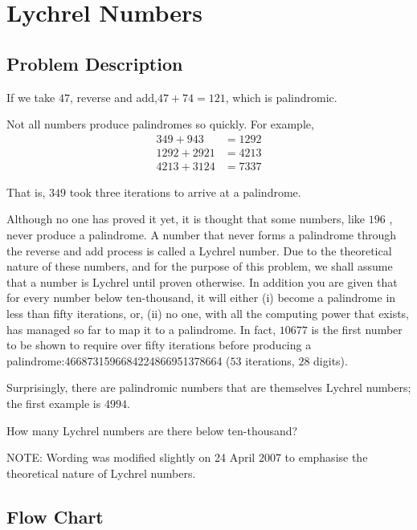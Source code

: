 \chapter{Lychrel Numbers}

\section{Problem Description}
If we take $47$, reverse and add,$47 + 74 = 121$, which is palindromic.

Not all numbers produce palindromes so quickly. For example,
\begin{align*}
	349 + 943   & = 1292 \\
	1292 + 2921 & = 4213 \\
	4213 + 3124 & = 7337
\end{align*}

That is, $349$ took three iterations to arrive at a palindrome.

Although no one has proved it yet, it is thought that some numbers, like $196$ 
, never produce a palindrome. A number that never forms a palindrome through the reverse and add process is called a
Lychrel number. Due to the theoretical nature of these numbers, and for the purpose of this problem, we shall assume
that a number is Lychrel until proven otherwise. In addition you are given that for every number below ten-thousand, it
will either (i) become a palindrome in less than fifty iterations, or, (ii) no one, with all the computing power that
exists, has managed so far to map it to a palindrome. In fact, $10677$
is the first number to be shown to require over fifty iterations before producing a palindrome:4668731596684224866951378664
($53$ iterations, $28$ digits).

Surprisingly, there are palindromic numbers that are themselves Lychrel numbers; the first example is $4994$.

How many Lychrel numbers are there below ten-thousand?

NOTE: Wording was modified slightly on 24 April 2007 to emphasise the theoretical nature of Lychrel numbers.

\section{Flow Chart}


